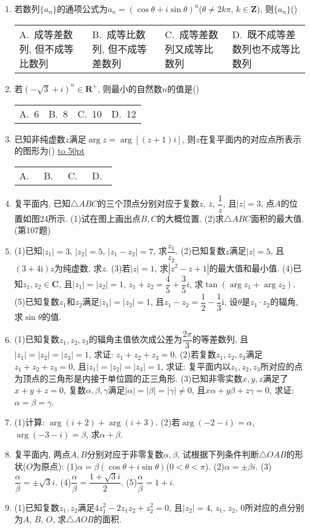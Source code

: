 \documentclass[10pt,a4paper]{article}
\newcommand{\blank}[1]{\underline{\hbox to #1pt{}}}
\newcommand{\fourch}[4]{\par\begin{tabular}{p{.23\textwidth}p{.23\textwidth}p{.23\textwidth}p{.23\textwidth}}
A.~#1 &B.~#2& C.~#3& D.~#4
\end{tabular}}
\begin{document}
\begin{enumerate}[1.]
(4)$[\dfrac{3\pi }4,\dfrac{5\pi }4]$.						(B)$[\dfrac{5\pi }4,\dfrac{7\pi }4]$.
(C)$[\dfrac{\pi }4,\dfrac{7\pi }4]$.						(D)$[0,\dfrac{\pi }4]\cup [\dfrac{7\pi }4,2\pi)$.
\item 若数列$\{a_n\}$的通项公式为$a_n=(\cos \theta +i\sin \theta)^n$($\theta \ne 2k\pi$, $k\in \mathbf{Z}$), 则$\{a_n\}$()
\fourch{成等差数列, 但不成等比数列}{成等比数列, 但不成等差数列}{成等差数列又成等比数列}{既不成等差数列也不成等比数列}
\item 若$(-\sqrt 3+i)^n\in \mathbf{R}^+$, 则最小的自然数$n$的值是()
\fourch{6}{8}{10}{12}
\item 已知非纯虚数$z$满足$\arg z=\arg [(z+1)i]$, 则$z$在复平面内的对应点所表示的图形为()
\blank{50}\fourch{}{}{}{}
\item 复平面内, 已知$\triangle ABC$的三个顶点分别对应于复数$z$, $\overline z$, $\dfrac 1z$, 且$|z|=3$, 点$A$的位置如图24所示.
(1)试在图上画出点$B,C$的大概位置.
(2)求$\triangle ABC$面积的最大值.
(第107题)
\item (1)已知$|z_1|=3$, $|z_2|=5$, $|z_1-z_2|=7$, 求$\dfrac{z_1}{z_2}$.
(2)已知复数$z$满足$|z|=5$, 且$(3+4\mathrm{i})z$为纯虚数, 求$z$.
(3)若$|z|=1$, 求$|z^2-z+1|$的最大值和最小值.
(4)已知$z_1,z_2\in \mathbf{C}$, 且$|z_1|=|z_2|=1$, $z_1+z_2=\dfrac 45+\dfrac 35i$, 求$\tan (\arg z_1+\arg z_2)$.
(5)已知复数$z_1$和$z_2$满足$|z_1|=|z_2|=1$, 且$z_1-z_2=\dfrac 12-\dfrac 13\mathrm{i}$, 设$\theta$是$z_1\cdot z_2$的辐角, 求$\sin \theta$的值.
\item (1)已知复数$z_1,z_2,z_3$的辐角主值依次成公差为$\dfrac{2\pi }3$的等差数列, 且$|z_1|=|z_2|=|z_3|=1$, 求证: $z_1+z_2+z_3=0$.
(2)若复数$z_1,z_2,z_3$满足$z_1+z_2+z_3=0$, 且$|z_1|=|z_2|=|z_3|=1$, 求证: 复平面内以$z_1,z_2,z_3$所对应的点为顶点的三角形是内接于单位圆的正三角形.
(3)已知非零实数$x,y,z$满足了$x+y+z=0$, 复数$\alpha ,\beta ,\gamma$满足$|\alpha|=|\beta|=|\gamma|\ne 0$, 且$x\alpha +y\beta +z\gamma =0$, 求证: $\alpha =\beta =\gamma$.
\item (1)计算: $\arg (i+2)+\arg (i+3)$.
(2)若$\arg (-2-i)=\alpha$, $\arg (-3-i)=\beta$, 求$\alpha +\beta$.
\item 复平面内, 两点$A,B$分别对应于非零复数$\alpha ,\beta$, 试根据下列条件判断$\triangle OAB$的形状($O$为原点):
(1)$\alpha =\beta (\cos \theta +i\sin \theta)$($0<\theta <\pi$).	(2)$\alpha =\pm \beta i$.
(3)$\dfrac{\alpha }{\beta }=\pm \sqrt 3i$.							(4)$\dfrac{\alpha }{\beta }=\dfrac{1+\sqrt 3i}2$.
(5)$\dfrac{\alpha }{\beta }=1+i$.
\item (1)已知复数$z_1,z_2$满足$4z_1^2-2z_1z_2+z_2^2=0$, 且$|z_2|=4$, $z_1$, $z_2$, 0所对应的点分别为$A$, $B$, $O$, 求$\triangle AOB$的面积.

\end{enumerate}
\end{document}
